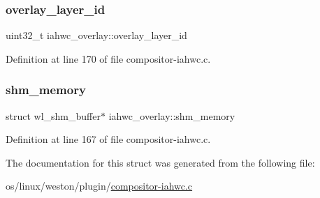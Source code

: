 \subsubsection{\texorpdfstring{overlay\+\_\+layer\+\_\+id}{overlay\_layer\_id}}
{\footnotesize\ttfamily uint32\+\_\+t iahwc\+\_\+overlay\+::overlay\+\_\+layer\+\_\+id}



Definition at line 170 of file compositor-\/iahwc.\+c.

\mbox{\label{structiahwc__overlay_a4ab6d321c6af6b1668b0bfe22081544c}} 
\subsubsection{\texorpdfstring{shm\+\_\+memory}{shm\_memory}}
{\footnotesize\ttfamily struct wl\+\_\+shm\+\_\+buffer$\ast$ iahwc\+\_\+overlay\+::shm\+\_\+memory}



Definition at line 167 of file compositor-\/iahwc.\+c.



The documentation for this struct was generated from the following file\+:\begin{DoxyCompactItemize}
\item 
os/linux/weston/plugin/\mbox{\hyperlink{compositor-iahwc_8c}{compositor-\/iahwc.\+c}}\end{DoxyCompactItemize}
